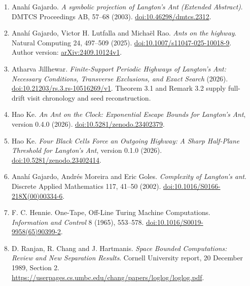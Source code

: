 \documentclass[
  11pt,
]{article}
\begin{document}
\begingroup\small
\begin{enumerate}
\def\labelenumi{\arabic{enumi}.}
\item
  Anahí Gajardo. \emph{A symbolic projection of Langton's Ant (Extended
  Abstract)}. DMTCS Proceedings AB, 57--68 (2003).
  \href{https://doi.org/10.46298/dmtcs.2312}{doi:10.46298/dmtcs.2312}.
\item
  Anahí Gajardo, Victor H. Lutfalla and Michaël Rao. \emph{Ants on the
  highway}. Natural Computing 24, 497--509 (2025).
  \href{https://doi.org/10.1007/s11047-025-10018-9}{doi:10.1007/s11047-025-10018-9}.
  Author version: \href{https://arxiv.org/abs/2409.10124v1}{arXiv:2409.10124v1}.
\item
  Atharva Jillhewar. \emph{Finite-Support Periodic Highways of Langton's
  Ant: Necessary Conditions, Transverse Exclusions, and Exact Search}
  (2026).
  \href{https://doi.org/10.21203/rs.3.rs-10516269/v1}{doi:10.21203/rs.3.rs-10516269/v1}.
  Theorem 3.1 and Remark 3.2 supply full-drift visit chronology and seed
  reconstruction.
\item
  Hao Ke. \emph{An Ant on the Clock: Exponential Escape Bounds for
  Langton's Ant}, version 0.4.0 (2026).
  \href{https://doi.org/10.5281/zenodo.23402379}{doi:10.5281/zenodo.23402379}.
\item
  Hao Ke. \emph{Four Black Cells Force an Outgoing Highway: A Sharp
  Half-Plane Threshold for Langton's Ant}, version 0.1.0 (2026).
  \newline\href{https://doi.org/10.5281/zenodo.23402414}{doi:10.5281/zenodo.23402414}.
\item
  Anahí Gajardo, Andrés Moreira and Eric Goles. \emph{Complexity of
  Langton's ant}. Discrete Applied Mathematics 117, 41--50 (2002).
  \href{https://doi.org/10.1016/S0166-218X(00)00334-6}{doi:10.1016/S0166-218X(00)00334-6}.
\item F. C. Hennie. One-Tape, Off-Line Turing Machine Computations.
\emph{Information and Control} 8 (1965), 553--578.
\href{https://doi.org/10.1016/S0019-9958(65)90399-2}{doi:10.1016/S0019-9958(65)90399-2}.
\item D. Ranjan, R. Chang and J. Hartmanis. \emph{Space Bounded Computations:
Review and New Separation Results}. Cornell University report,
20 December 1989, Section 2.
\url{https://userpages.cs.umbc.edu/chang/papers/loglog/loglog.pdf}.
\end{enumerate}
\endgroup
\end{document}
